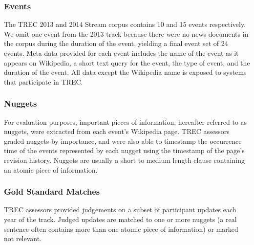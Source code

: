 \subsubsection{Events}

The TREC 2013 and 2014 Stream corpus contains  10 and 15 events respectively. We omit
one event from the 2013 track because there were no news documents in the 
corpus during the duration of the event, yielding a final event set of 24 
events. Meta-data provided for each event includes the name of the event
as it appears on Wikipedia, a short text query for the event, 
the type of event, and the 
duration of the event.
All data except the Wikipedia name is exposed to
systems that participate in TREC.

\subsubsection{Nuggets}
For evaluation purposes, important pieces of information, hereafter 
referred to as nuggets, were extracted from each event's Wikipedia page.
TREC assessors graded nuggets by importance, and were also able to timestamp
the occurrence time of the events represented by each nugget
using the timestamp of the page's revision history. Nuggets are 
usually a short to medium length clause containing an atomic piece of
information.

\subsubsection{Gold Standard Matches}
TREC assessors provided judgements on a subset of participant updates each year
of the track. Judged updates are matched to one or more nuggets (a real 
sentence often contains more than one atomic piece of information) or marked
not relevant.

